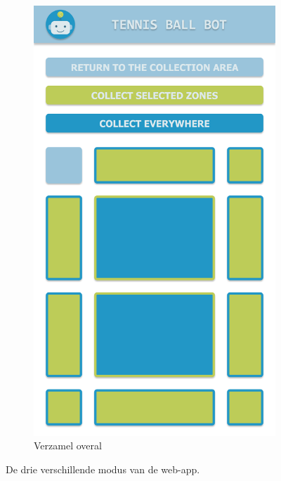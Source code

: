 \begin{figure}[H]
\begin{subfigure}{0.3\textwidth}
        \includegraphics[width=0.9\linewidth]{img/mode-3.png}
        \caption{Verzamel overal
        \newline}
        \label{fig:mode3}
    \end{subfigure}
    \caption{De drie verschillende modus van de web-app.}
    \label{fig:web-app-modues}
\end{figure}

